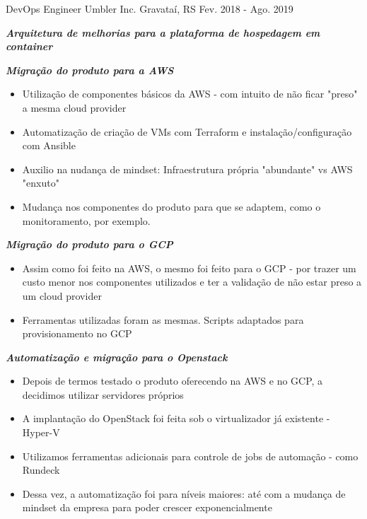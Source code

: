 \begin{cventries}
  \cventry
    {DevOps Engineer}
    {Umbler Inc.}
    {Gravataí, RS}
    {Fev. 2018 - Ago. 2019}
    {
      \begin{cvitems}
        \item \textit{\textbf{Arquitetura de melhorias para a plataforma de hospedagem em container}}
        \item \textit{\textbf{Migração do produto para a AWS}}
        \begin{itemize}
            \item Utilização  de componentes básicos da AWS - com intuito de não ficar "preso" a mesma cloud provider
            \item Automatização de criação de VMs com Terraform e instalação/configuração com Ansible
            \item Auxilio na nudança de mindset: Infraestrutura própria "abundante" vs AWS "enxuto"
            \item Mudança nos componentes do produto para que se adaptem, como o monitoramento, por exemplo.
        \end{itemize}
        \item \textit{\textbf{Migração do produto para o GCP}}
        \begin{itemize}
            \item Assim como foi feito na AWS, o mesmo foi feito para o GCP - por trazer um custo menor nos componentes utilizados e ter a validação de não estar preso a um cloud provider
            \item Ferramentas utilizadas foram as mesmas. Scripts adaptados para provisionamento no GCP
        \end{itemize}
        \item \textit{\textbf{Automatização e migração para o Openstack}}
        \begin{itemize}
            \item Depois de termos testado o produto oferecendo na AWS e no GCP, a decidimos utilizar servidores próprios 
            \item A implantação do OpenStack foi feita sob o virtualizador já existente - Hyper-V
            \item Utilizamos ferramentas adicionais para controle de jobs de automação - como Rundeck
            \item Dessa vez, a automatização foi para níveis maiores: até com a mudança de mindset da empresa para poder crescer exponencialmente
        \end{itemize}
      \end{cvitems}
    }
    

\end{cventries}
